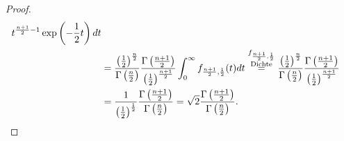\begin{proof}
\begin{align*}
                      t^{\frac {n+1} 2 - 1}\exp\left(-\frac 1 2 t \right)dt\\
&=\frac {\left(\frac 1 2 \right)^{\frac n 2}} {\Gamma\left(\frac n 2\right)} 
\frac{\Gamma\left(\frac{n+1}2 \right)}{\left(\frac 12\right)^{\frac{n+1}{2}}}
\int_0^\infty f_{\frac{n+1}2, \frac 1 2}(t) dt
\overset{\substack{f_{\frac{n+1}2, \frac 1 2}\\\text{Dichte}}}= \frac {\left(\frac 1 2 \right)^{\frac n 2}} {\Gamma\left(\frac n 2\right)} 
\frac{\Gamma\left(\frac{n+1}2 \right)}{\left(\frac 12\right)^{\frac{n+1}{2}}}\\
&= \frac 1{\left(\frac 1 2 \right)^{\frac 1 2}} 
   \frac{\Gamma\left(\frac{n+1}2 \right)}
        {\Gamma\left(\frac n 2\right)}
= \sqrt 2\frac{\Gamma\left(\frac{n+1}2\right)}{\Gamma\left(\frac n 2 \right)}
\text. 
\end{align*}
\end{proof}